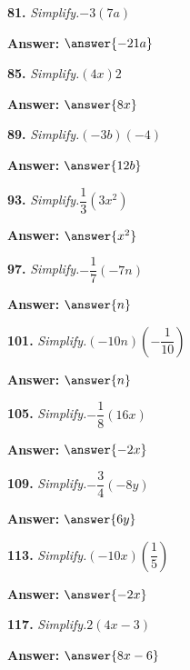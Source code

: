\documentclass{ximera}
\begin{document}
\begin{problem}
\textbf{81.} \emph{Simplify.}\quad $-3(7a)$

\textbf{Answer:} $\answer{-21a}$
\end{problem}

\begin{problem}
\textbf{85.} \emph{Simplify.}\quad $(4x)2$

\textbf{Answer:} $\answer{8x}$
\end{problem}

\begin{problem}
\textbf{89.} \emph{Simplify.}\quad $(-3b)(-4)$

\textbf{Answer:} $\answer{12b}$
\end{problem}

\begin{problem}
\textbf{93.} \emph{Simplify.}\quad $\dfrac{1}{3}\!\left(3x^2\right)$

\textbf{Answer:} $\answer{x^{2}}$
\end{problem}

\begin{problem}
\textbf{97.} \emph{Simplify.}\quad $-\dfrac{1}{7}(-7n)$

\textbf{Answer:} $\answer{n}$
\end{problem}

\begin{problem}
\textbf{101.} \emph{Simplify.}\quad $(-10n)\!\left(-\dfrac{1}{10}\right)$

\textbf{Answer:} $\answer{n}$
\end{problem}

\begin{problem}
\textbf{105.} \emph{Simplify.}\quad $-\dfrac{1}{8}(16x)$

\textbf{Answer:} $\answer{-2x}$
\end{problem}

\begin{problem}
\textbf{109.} \emph{Simplify.}\quad $-\dfrac{3}{4}(-8y)$

\textbf{Answer:} $\answer{6y}$
\end{problem}

\begin{problem}
\textbf{113.} \emph{Simplify.}\quad $(-10x)\!\left(\dfrac{1}{5}\right)$

\textbf{Answer:} $\answer{-2x}$
\end{problem}

\begin{problem}
\textbf{117.} \emph{Simplify.}\quad $2(4x - 3)$

\textbf{Answer:} $\answer{8x -6}$
\end{problem}
\end{document}
